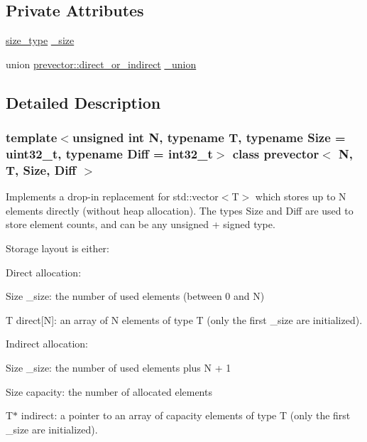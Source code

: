 \subsection*{Private Attributes}
\begin{DoxyCompactItemize}
\item 
\mbox{\hyperlink{classprevector_a7e0da95e6d1c878f6eeb572f4fc12524}{size\+\_\+type}} \mbox{\hyperlink{classprevector_a39aa524551033e56732901dca003d69d}{\+\_\+size}}
\item 
union \mbox{\hyperlink{unionprevector_1_1direct__or__indirect}{prevector\+::direct\+\_\+or\+\_\+indirect}} \mbox{\hyperlink{classprevector_a63f4581aed8f75e5b18e985d368b0ac0}{\+\_\+union}}
\end{DoxyCompactItemize}


\subsection{Detailed Description}
\subsubsection*{template$<$unsigned int N, typename T, typename Size = uint32\+\_\+t, typename Diff = int32\+\_\+t$>$\newline
class prevector$<$ N, T, Size, Diff $>$}

Implements a drop-\/in replacement for std\+::vector$<$\+T$>$ which stores up to N elements directly (without heap allocation). The types Size and Diff are used to store element counts, and can be any unsigned + signed type.

Storage layout is either\+:
\begin{DoxyItemize}
\item Direct allocation\+:
\begin{DoxyItemize}
\item Size \+\_\+size\+: the number of used elements (between 0 and N)
\item T direct\mbox{[}N\mbox{]}\+: an array of N elements of type T (only the first \+\_\+size are initialized).
\end{DoxyItemize}
\item Indirect allocation\+:
\begin{DoxyItemize}
\item Size \+\_\+size\+: the number of used elements plus N + 1
\item Size capacity\+: the number of allocated elements
\item T$\ast$ indirect\+: a pointer to an array of capacity elements of type T (only the first \+\_\+size are initialized).
\end{DoxyItemize}
\end{DoxyItemize}

